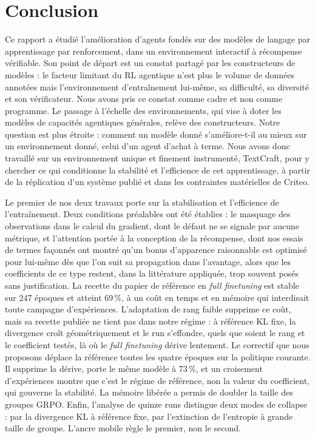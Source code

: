 \documentclass[11pt,a4paper]{article}
\begin{document}
\clearpage
\section{Conclusion}

Ce rapport a étudié l'amélioration d'agents fondés sur des modèles de langage par apprentissage par renforcement, dans un environnement interactif à récompense vérifiable. Son point de départ est un constat partagé par les constructeurs de modèles : le facteur limitant du RL agentique n'est plus le volume de données annotées mais l'environnement d'entraînement lui-même, sa difficulté, sa diversité et son vérificateur. Nous avons pris ce constat comme cadre et non comme programme. Le passage à l'échelle des environnements, qui vise à doter les modèles de capacités agentiques générales, relève des constructeurs. Notre question est plus étroite : comment un modèle donné s'améliore-t-il au mieux sur un environnement donné, celui d'un agent d'achat à terme. Nous avons donc travaillé sur un environnement unique et finement instrumenté, TextCraft, pour y chercher ce qui conditionne la stabilité et l'efficience de cet apprentissage, à partir de la réplication d'un système publié et dans les contraintes matérielles de Criteo.

Le premier de nos deux travaux porte sur la stabilisation et l'efficience de l'entraînement. Deux conditions préalables ont été établies : le masquage des observations dans le calcul du gradient, dont le défaut ne se signale par aucune métrique, et l'attention portée à la conception de la récompense, dont nos essais de termes façonnés ont montré qu'un bonus d'apparence raisonnable est optimisé pour lui-même dès que l'on suit sa propagation dans l'avantage, alors que les coefficients de ce type restent, dans la littérature appliquée, trop souvent posés sans justification. La recette du papier de référence en \emph{full finetuning} est stable sur 247 époques et atteint 69\,\%, à un coût en temps et en mémoire qui interdisait toute campagne d'expériences. L'adaptation de rang faible supprime ce coût, mais sa recette publiée ne tient pas dans notre régime : à référence KL fixe, la divergence croît géométriquement et le run s'effondre, quels que soient le rang et le coefficient testés, là où le \emph{full finetuning} dérive lentement. Le correctif que nous proposons déplace la référence toutes les quatre époques sur la politique courante. Il supprime la dérive, porte le même modèle à 73\,\%, et un croisement d'expériences montre que c'est le régime de référence, non la valeur du coefficient, qui gouverne la stabilité. La mémoire libérée a permis de doubler la taille des groupes GRPO. Enfin, l'analyse de quinze runs distingue deux modes de collapse : par la divergence KL à référence fixe, par l'extinction de l'entropie à grande taille de groupe. L'ancre mobile règle le premier, non le second.
\end{document}
